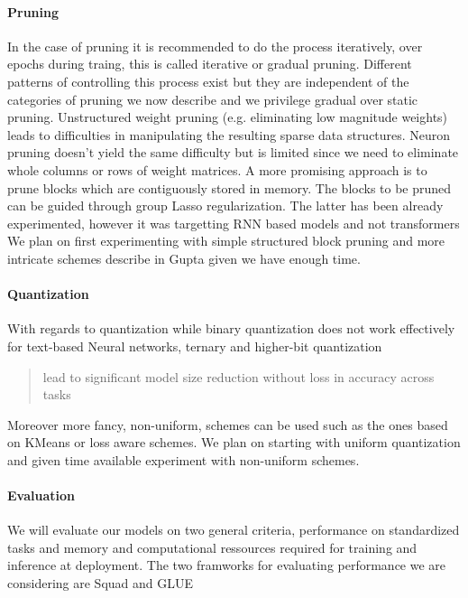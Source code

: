 \documentclass{article}
\begin{document}
\paragraph{Pruning} In the case of pruning it is recommended to do the process
iteratively, over epochs during traing, this is called iterative or gradual
pruning. Different patterns of controlling this process exist but they are
independent of the categories of pruning we now describe and we privilege
gradual over static pruning. Unstructured weight pruning (e.g. eliminating low
magnitude weights) leads to difficulties in manipulating the resulting sparse
data structures.  Neuron pruning doesn't yield the same difficulty but is
limited since we need to eliminate whole columns or rows of weight matrices. A
more promising approach is to prune blocks which are contiguously stored in
memory. The blocks to be pruned can be guided through group Lasso
regularization. The latter has been already experimented, however it was
targetting RNN based models and not transformers\cite{blocksparse} We plan on
first experimenting with simple structured block pruning and more intricate
schemes describe in Gupta given we have enough time.

\paragraph{Quantization} With regards to quantization while binary quantization
does not work effectively for text-based Neural networks, ternary and higher-bit
quantization \blockcquote{gupta2020compression}{lead to significant model size
reduction without loss in accuracy across tasks}. Moreover more fancy,
non-uniform, schemes can be used such as the ones based on KMeans or loss aware
schemes.  We plan on starting with uniform quantization and given time available
experiment with non-uniform schemes.

\paragraph{Evaluation} We will evaluate our models on two general criteria,
performance on standardized tasks and memory and computational ressources required
for training and inference at deployment. The two framworks for evaluating performance
we are considering are Squad\cite{squad} and GLUE\cite{glue}




\clearpage


\end{document}
